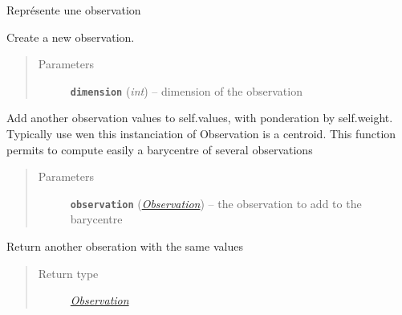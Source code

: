 \documentclass[letterpaper,10pt,english]{sphinxmanual}
\begin{document}
\begin{fulllineitems}
\label{impl:kmeans.Observation}
Représente une observation

\begin{fulllineitems}
\label{impl:kmeans.Observation.__init__}
Create a new observation.
\begin{quote}\begin{description}
\item[{Parameters}] \leavevmode
\textbf{\texttt{dimension}} (\emph{int}) -- dimension of the observation

\end{description}\end{quote}

\end{fulllineitems}


\begin{fulllineitems}
\label{impl:kmeans.Observation.add}
Add another observation values to self.values, with ponderation by self.weight.
Typically use wen this instanciation of Observation is a centroid.
This function permits to compute easily a barycentre of several observations
\begin{quote}\begin{description}
\item[{Parameters}] \leavevmode
\textbf{\texttt{observation}} ({\hyperref[impl:kmeans.Observation]{\emph{\emph{Observation}}}}) -- the observation to add to the barycentre

\end{description}\end{quote}

\end{fulllineitems}


\begin{fulllineitems}
\label{impl:kmeans.Observation.copy}
Return another obseration with the same values
\begin{quote}\begin{description}
\item[{Return type}] \leavevmode
{\hyperref[impl:kmeans.Observation]{\emph{Observation}}}


\end{description}
\end{quote}
\end{fulllineitems}
\end{fulllineitems}
\end{document}
